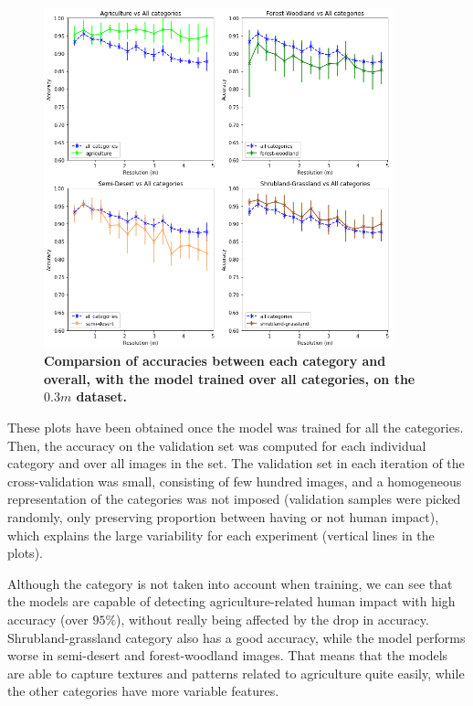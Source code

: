 \begin{figure}[h!]
	\centering
	\includegraphics[width=0.9\textwidth]{Figures/results/acc_res_by_category_03m.png}
	\captionsetup{width=1\linewidth}
	\caption{\textbf{Comparsion of accuracies between each category and overall, with the model trained over all categories, on the $0.3m$ dataset.}}
	\label{fig:acc_by_cat_03m}
\end{figure}

These plots have been obtained once the model was trained for all the categories. Then, the accuracy on the validation set was computed for each individual category and over all images in the set. The validation set in each iteration of the cross-validation was small, consisting of few hundred images, and a homogeneous representation of the categories was not imposed (validation samples were picked randomly, only preserving proportion between having or not human impact), which explains the large variability for each experiment (vertical lines in the plots).

Although the category is not taken into account when training, we can see that the models are capable of detecting agriculture-related human impact with high accuracy (over $95\%$), without really being affected by the drop in accuracy. Shrubland-grassland category also has a good accuracy, while the model performs worse in semi-desert and forest-woodland images. That means that the models are able to capture textures and patterns related to agriculture quite easily, while the other categories have more variable features.


